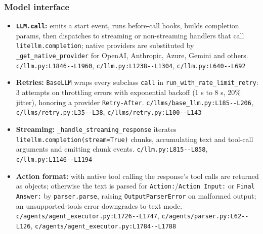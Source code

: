 \subsubsection*{Model interface}
\begin{itemize}
\item \textbf{\texttt{LLM.\allowbreak{}call}:} emits a start event, runs before-call hooks, builds completion params, then dispatches to streaming or non-streaming handlers that call \texttt{litellm.\allowbreak{}completion}; native providers are substituted by \texttt{\_\allowbreak{}get\_\allowbreak{}native\_\allowbreak{}provider} for OpenAI, Anthropic, Azure, Gemini and others. \texttt{c/\allowbreak{}llm.\allowbreak{}py:\allowbreak{}L1846-\allowbreak{}-\allowbreak{}L1960}, \texttt{c/\allowbreak{}llm.\allowbreak{}py:\allowbreak{}L1238-\allowbreak{}-\allowbreak{}L1304}, \texttt{c/\allowbreak{}llm.\allowbreak{}py:\allowbreak{}L640-\allowbreak{}-\allowbreak{}L692}
\item \textbf{Retries:} \texttt{BaseLLM} wraps every subclass \texttt{call} in \texttt{run\_\allowbreak{}with\_\allowbreak{}rate\_\allowbreak{}limit\_\allowbreak{}retry}: 3 attempts on throttling errors with exponential backoff (1 s to 8 s, 20\% jitter), honoring a provider \texttt{Retry-\allowbreak{}After}. \texttt{c/\allowbreak{}llms/\allowbreak{}base\_\allowbreak{}llm.\allowbreak{}py:\allowbreak{}L185-\allowbreak{}-\allowbreak{}L206}, \texttt{c/\allowbreak{}llms/\allowbreak{}retry.\allowbreak{}py:\allowbreak{}L35-\allowbreak{}-\allowbreak{}L38}, \texttt{c/\allowbreak{}llms/\allowbreak{}retry.\allowbreak{}py:\allowbreak{}L100-\allowbreak{}-\allowbreak{}L143}
\item \textbf{Streaming:} \texttt{\_\allowbreak{}handle\_\allowbreak{}streaming\_\allowbreak{}response} iterates \texttt{litellm.\allowbreak{}completion(\allowbreak{}stream=True)} chunks, accumulating text and tool-call arguments and emitting chunk events. \texttt{c/\allowbreak{}llm.\allowbreak{}py:\allowbreak{}L815-\allowbreak{}-\allowbreak{}L858}, \texttt{c/\allowbreak{}llm.\allowbreak{}py:\allowbreak{}L1146-\allowbreak{}-\allowbreak{}L1194}
\item \textbf{Action format:} with native tool calling the response's tool calls are returned as objects; otherwise the text is parsed for \texttt{Action:\allowbreak{}}/\texttt{Action Input:\allowbreak{}} or \texttt{Final Answer:\allowbreak{}} by \texttt{parser.\allowbreak{}parse}, raising \texttt{OutputParserError} on malformed output; an unsupported-tools error downgrades to text mode. \texttt{c/\allowbreak{}agents/\allowbreak{}agent\_\allowbreak{}executor.\allowbreak{}py:\allowbreak{}L1726-\allowbreak{}-\allowbreak{}L1747}, \texttt{c/\allowbreak{}agents/\allowbreak{}parser.\allowbreak{}py:\allowbreak{}L62-\allowbreak{}-\allowbreak{}L126}, \texttt{c/\allowbreak{}agents/\allowbreak{}agent\_\allowbreak{}executor.\allowbreak{}py:\allowbreak{}L1784-\allowbreak{}-\allowbreak{}L1788}
\end{itemize}

